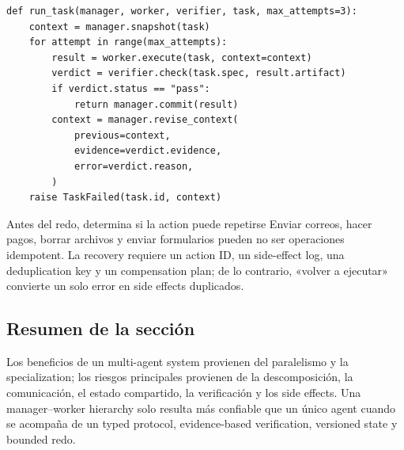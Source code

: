 \begin{lstlisting}[caption={Protocolo estructurado de verification y redo entre manager y worker}]
def run_task(manager, worker, verifier, task, max_attempts=3):
    context = manager.snapshot(task)
    for attempt in range(max_attempts):
        result = worker.execute(task, context=context)
        verdict = verifier.check(task.spec, result.artifact)
        if verdict.status == "pass":
            return manager.commit(result)
        context = manager.revise_context(
            previous=context,
            evidence=verdict.evidence,
            error=verdict.reason,
        )
    raise TaskFailed(task.id, context)
\end{lstlisting}

\begin{warningbox}{Antes del redo, determina si la action puede repetirse}
Enviar correos, hacer pagos, borrar archivos y enviar formularios pueden no ser operaciones idempotent. La recovery requiere un action ID, un side-effect log, una deduplication key y un compensation plan; de lo contrario, «volver a ejecutar» convierte un solo error en side effects duplicados.
\end{warningbox}


\subsection{Resumen de la sección}

Los beneficios de un multi-agent system provienen del paralelismo y la specialization; los riesgos principales provienen de la descomposición, la comunicación, el estado compartido, la verificación y los side effects. Una manager--worker hierarchy solo resulta más confiable que un único agent cuando se acompaña de un typed protocol, evidence-based verification, versioned state y bounded redo.
